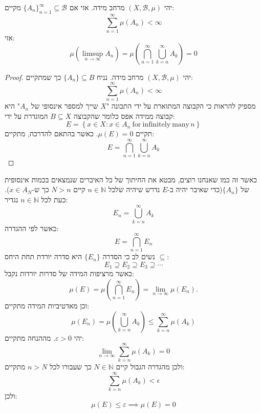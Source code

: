 \documentclass{tstextbook}
\begin{document}
\begin{theorem}
יהי \(\left( X,\mathcal{B},\mu \right)\) מרחב מידה. אזי אם \(\{ A_{n} \}_{n=1}^{\infty}\subseteq \mathcal{B}\) מקיים:
$$\sum_{n=1}^{\infty}\mu\left(A_{n}\right)<\infty$$
אזי:
$$\mu\left(\limsup_{n\to\infty}A_{n}\right)=\mu\left( \bigcap_{n=1}^{\infty}\bigcup_{k=n}^{\infty}A_{k} \right)=0$$

\end{theorem}
\begin{proof}
יהי \(\left( X,\mathcal{B} , \mu \right)\) מרחב מידה. נניח \(\{ A_{n} \}\subseteq B\) כך שמתקיים:
$$\sum_{n=1}^{\infty}\mu\left(A_{n}\right)<\infty$$
מספיק להראות כי הקבוצה המתוארת על ידי התכונה "\(X\) שייך למספר אינסופי של \(A_{n}\)" היא קבוצה ממידה אפס כלומר שהקבוצה \(B\subseteq X\) המוגדרת על ידי:
$$E=\left\{x\in X:x\in A_{n}{\mathrm{~for~infinitely~many}}\,n\right\}$$
תקיים \(\mu(E)=0\). כאשר בהתאם להדרכה, מתקיים:
$$E=\bigcap_{n=1}^{\infty}\bigcup_{k=n}^{\infty}A_{k}$$

\end{proof}
כאשר זה כמו שאנחנו רוצים, מבטא את החיתוך של כל האיברים שנמצאים בכמות אינסופית של \(\{ A_{n} \}\)(כדי שאיבר יהיה ב-\(E\) נדרש שיהיה שלכל \(n \in \mathbb{N}\) קיים \(N>n\) כך ש-\(x \in A_{N}\)). כעת לכל \(n \in \mathbb{N}\) נגדיר:
$$E_{n}=\bigcup_{k=n}^{\infty}A_{k}$$
כאשר לפי ההגדרה: 
$$E=\bigcap_{n=1}^{\infty}E_{n}$$
נשים לב כי הסדרה \(\{ E_{n} \}\) היא סדרה יורדת תחת היחס \(\subseteq\):
$$E_{1}\supseteq E_{2}\supseteq E_{3}\supseteq\cdots$$
כאשר מרציפות המידה של סדרות יורדות נקבל:
$$\mu(E)=\mu\left(\bigcap_{n=1}^{\infty}E_{n}\right)=\operatorname*{lim}_{n\to\infty}\mu(E_{n}).$$
וכן מאדטיביות המידה מתקיים:
$$\mu(E_{n})=\mu\left(\bigcup_{k=n}^{\infty}A_{k}\right)\leq\sum_{k=n}^{\infty}\mu(A_{k})$$
יהי \(\varepsilon> 0\). מההנחה מתקיים:
$$\lim_{ n \to \infty } \sum_{k=n}^{\infty} \mu(A_{k})=0$$
ולכן מהגדרה הגבול קיים \(N \in \mathbb{N}\) כך שעבורו לכל \(n > N\) מתקיים:
$$\sum_{k=n}^{\infty}\mu(A_{k})<\epsilon$$
ולכן:
$$\mu(E)\leq \varepsilon\implies \mu(E)=0$$
\end{document}
